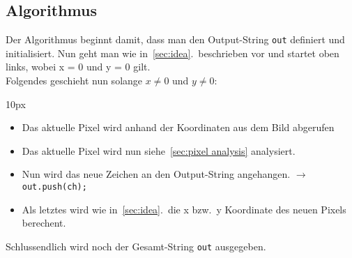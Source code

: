 \subsection{Algorithmus}
Der Algorithmus beginnt damit, dass man den Output-String \texttt{out} definiert und initialisiert.
Nun geht man wie in~\ref{sec:idea}.\ beschrieben vor und startet oben links, wobei x = 0 und y = 0 gilt.\\
\linebreak
Folgendes geschieht nun solange $x \neq 0$ und $y \neq 0$:
\begin{adjustwidth}{10px}{}
\begin{itemize}
\item Das aktuelle Pixel wird anhand der Koordinaten aus dem Bild abgerufen
\item Das aktuelle Pixel wird nun siehe~\ref{sec:pixel analysis} analysiert.
\item Nun wird das neue Zeichen an den Output-String angehangen. $\rightarrow$ \texttt{out.push(ch);}
\item Als letztes wird wie in~\ref{sec:idea}.\ die x bzw.\ y Koordinate des neuen Pixels berechent.
\end{itemize}
\end{adjustwidth}
\vspace*{0.5cm}
Schlussendlich wird noch der Gesamt-String \texttt{out} ausgegeben.